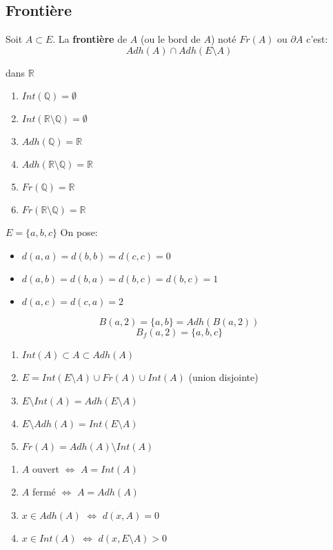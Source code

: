 \documentclass[a4paper]{report}
\newcommand\R{\ensuremath{\mathbb{R}}}
\renewcommand\O{\ensuremath{\emptyset}}
\newcommand\Q{\ensuremath{\mathbb{Q}}}
\let\iff\Leftrightarrow
\theoremstyle{definition}
\begin{document}
\subsection{Frontière}
 \begin{definition}
     Soit $A \subset E$. La \textbf{frontière} de $A$ (ou le bord de $A$) noté $Fr(A)$ ou  $\partial A$ c'est:
      \[
     Adh(A) \cap Adh(E \setminus A)
     \] 
 \end{definition}
 \begin{eg} dans $\R$
    \begin{enumerate}
        \item $Int(\Q) = \O$
        \item $Int(\R \setminus \Q) = \O$
        \item $Adh(\Q) = \R$
        \item $Adh(\R \setminus \Q) = \R$
        \item $Fr(\Q) = \R$
        \item $Fr(\R \setminus \Q) = \R$
    \end{enumerate} 
 \end{eg}
 \begin{eg} $E = \{a, b, c\}$
    On pose:
    \begin{itemize}
        \item $d(a,a) = d(b,b) = d(c,c) = 0$
        \item  $d(a,b) = d(b,a) = d(b,c) = d(b,c) = 1$
        \item  $d(a,c) = d(c, a) = 2$
    \end{itemize}
    \[
        B(a,2) = \{a, b\} = Adh(B(a, 2))
    \] 
    \[
        B_f(a, 2) = \{a, b, c\}
    \] 
 \end{eg}
 \begin{prop}
    \begin{enumerate}
        \item $Int(A) \subset A \subset Adh(A)$
        \item $E = Int(E \setminus A) \cup Fr(A) \cup Int(A)$ (union disjointe)
        \item $E \setminus Int(A) = Adh(E \setminus A)$
        \item $E \setminus Adh(A) = Int(E \setminus A)$
        \item $Fr(A) = Adh(A) \setminus Int(A)$
    \end{enumerate} 
 \end{prop}
 \begin{prop}
     \begin{enumerate}
         \item $A$ ouvert  $\iff$ $A = Int(A)$
         \item  $A$ fermé  $\iff$ $A = Adh(A)$
         \item  $x \in Adh(A)$  $\iff$ $d(x, A) = 0$
         \item  $x \in Int(A)$  $\iff$ $d(x, E \setminus A) > 0$
     \end{enumerate}
 \end{prop}
\end{document}
